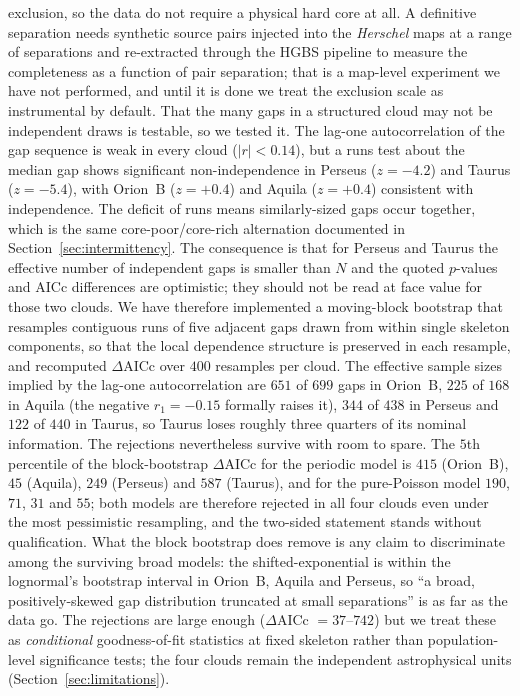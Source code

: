 \documentclass[usenatbib,twoside,twocolumn]{mnras}
\begin{document}
exclusion, so the data do not require a physical hard core at all. A definitive separation needs synthetic source pairs injected into the \textit{Herschel} maps at a range of separations and re-extracted through the HGBS pipeline to measure the completeness as a function of pair separation; that is a map-level experiment we have not performed, and until it is done we treat the exclusion scale as instrumental by default. That the many gaps in a structured cloud may not be independent draws is testable, so we tested it. The lag-one autocorrelation of the gap sequence is weak in every cloud ($|r|<0.14$), but a runs test about the median gap shows significant non-independence in Perseus ($z=-4.2$) and Taurus ($z=-5.4$), with Orion~B ($z=+0.4$) and Aquila ($z=+0.4$) consistent with independence. The deficit of runs means similarly-sized gaps occur together, which is the same core-poor/core-rich alternation documented in Section~\ref{sec:intermittency}. The consequence is that for Perseus and Taurus the effective number of independent gaps is smaller than $N$ and the quoted $p$-values and AICc differences are optimistic; they should not be read at face value for those two clouds. We have therefore implemented a moving-block bootstrap that resamples contiguous runs of five adjacent gaps drawn from within single skeleton components, so that the local dependence structure is preserved in each resample, and recomputed $\Delta$AICc over $400$ resamples per cloud. The effective sample sizes implied by the lag-one autocorrelation are $651$ of $699$ gaps in Orion~B, $225$ of $168$ in Aquila (the negative $r_1=-0.15$ formally raises it), $344$ of $438$ in Perseus and $122$ of $440$ in Taurus, so Taurus loses roughly three quarters of its nominal information. The rejections nevertheless survive with room to spare. The $5$th percentile of the block-bootstrap $\Delta$AICc for the periodic model is $415$ (Orion~B), $45$ (Aquila), $249$ (Perseus) and $587$ (Taurus), and for the pure-Poisson model $190$, $71$, $31$ and $55$; both models are therefore rejected in all four clouds even under the most pessimistic resampling, and the two-sided statement stands without qualification. What the block bootstrap does remove is any claim to discriminate among the surviving broad models: the shifted-exponential is within the lognormal's bootstrap interval in Orion~B, Aquila and Perseus, so ``a broad, positively-skewed gap distribution truncated at small separations'' is as far as the data go. The rejections are large enough ($\Delta$AICc $=37$--$742$) but we treat these as \emph{conditional} goodness-of-fit statistics at fixed skeleton rather than population-level significance tests; the four clouds remain the independent astrophysical units (Section~\ref{sec:limitations}).
\end{document}
